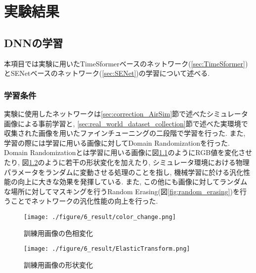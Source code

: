 \chapter{実験結果}

\section{DNNの学習}
本項目では実験に用いたTimeSformerベースのネットワーク(\ref{sec:TimeSformer})とSENetベースのネットワーク(\ref{sec:SENet})の学習について述べる.

\subsection{学習条件}\label{sec:Train_Env}
実験に使用したネットワークは\ref{sec:correction_AirSim}節で述べたシミュレータ画像による事前学習と, \ref{sec:real_world_dataset_collection}節で述べた実環境で収集された画像を用いたファインチューニング\cite{Fine_Tuning_Survey}の二段階で学習を行った. また, 学習の際には学習に用いる画像に対してDomain Randomization\cite{Domain_Randomization_paper}を行った. Domain Randomizationとは学習に用いる画像に図\ref{fig:color_change}のようにRGB値を変化させたり, 図\ref{fig:elastic_transform}のように若干の形状変化を加えたり, シミュレータ環境における物理パラメータをランダムに変動させる処理のことを指し, 機械学習に於ける汎化性能の向上に大きな効果を発揮している\cite{Domain_Randomization_1}\cite{Domain_Randomization_2}\cite{Domain_Randomization_3}. また, この他にも画像に対してランダムな場所に対してマスキングを行うRandom Erasing\cite{Random_Erasing_Paper}(図\ref{fig:random_erasing})を行うことでネットワークの汎化性能の向上を行った.\par

\begin{figure}[thpb]
  \begin{minipage}[htpb]{1.0\hsize}
  \begin{center}
  \texttt{[image: ./figure/6\_result/color\_change.png]}
  \caption{訓練用画像の色相変化}
  \label{fig:color_change}
  \end{center}
  \end{minipage}
\end{figure}

\begin{figure}[thpb]
  \begin{minipage}[htpb]{1.0\hsize}
  \begin{center}
  \texttt{[image: ./figure/6\_result/ElasticTransform.png]}
  \caption{訓練用画像の形状変化}
  \label{fig:elastic_transform}
  \end{center}
  \end{minipage}
\end{figure}

